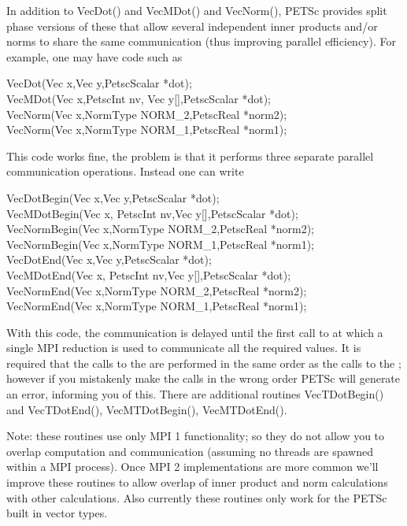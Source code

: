 In addition to VecDot() and VecMDot() and VecNorm(), PETSc provides
split phase versions of these that allow several independent inner products and/or norms
to share the same communication (thus improving parallel efficiency). For example,
one may have code such as
\begin{tabbing}
 VecDot(Vec x,Vec y,PetscScalar *dot);\\
 VecMDot(Vec x,PetscInt nv, Vec y[],PetscScalar *dot);\\
 VecNorm(Vec x,NormType NORM\_2,PetscReal *norm2);\\
 VecNorm(Vec x,NormType NORM\_1,PetscReal *norm1);
\end{tabbing}
This code works fine, the problem is that it performs three separate parallel communication
operations. Instead one can write
\begin{tabbing}
 VecDotBegin(Vec x,Vec y,PetscScalar *dot);\\
 VecMDotBegin(Vec x, PetscInt nv,Vec y[],PetscScalar *dot);\\
 VecNormBegin(Vec x,NormType NORM\_2,PetscReal *norm2);\\
 VecNormBegin(Vec x,NormType NORM\_1,PetscReal *norm1);\\
 VecDotEnd(Vec x,Vec y,PetscScalar *dot);\\
 VecMDotEnd(Vec x, PetscInt nv,Vec y[],PetscScalar *dot);\\
 VecNormEnd(Vec x,NormType NORM\_2,PetscReal *norm2);\\
 VecNormEnd(Vec x,NormType NORM\_1,PetscReal *norm1);
\end{tabbing}
With this code,
the communication is delayed until the first call to
 at which
a single MPI reduction is used to communicate all the required values. It is required that the
calls to the  are performed in the same order as the calls to the
; however if you mistakenly make the calls in the wrong order PETSc
will generate an error,
informing you of this. There are additional routines VecTDotBegin() and
VecTDotEnd(), VecMTDotBegin(), VecMTDotEnd().

Note: these routines use only MPI 1 functionality; so they do not allow you to overlap
computation and communication (assuming no threads are spawned within a MPI process).
Once MPI 2 implementations are more common we'll improve these
routines to allow overlap of inner product and norm calculations with other calculations.
Also currently these routines only work for the PETSc built in vector types.

